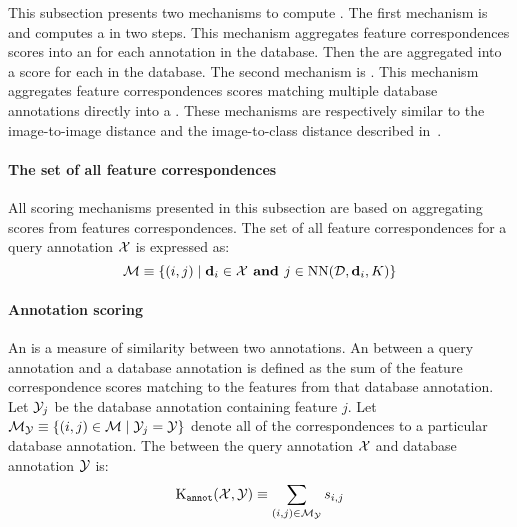         This subsection presents two mechanisms to compute \namescores{}. The first mechanism is \csumprefix{} and
        computes a \namescore{} in two steps. This mechanism aggregates feature correspondences scores into an
        \annotscore{} for each annotation in the database. Then the \annotscores{} are aggregated into a score for
        each \name{} in the database. The second mechanism is \nsumprefix{}. This mechanism aggregates feature
        correspondences scores matching multiple database annotations directly into a \namescore{}. These
        mechanisms are respectively similar to the image-to-image distance and the image-to-class distance
        described in~\cite{boiman_defense_2008}.

        \paragraph{The set of all feature correspondences}
        All scoring mechanisms presented in this subsection are based on aggregating scores from features
        correspondences. The set of all feature correspondences for a query annotation $\mathcal{X}$ is expressed as:
        \begin{equation}
            \mathcal{M} \equiv \{(i, j) \mid \mathbf{d}_i \in \mathcal{X} \textbf{ and } j \in \operatorname{NN}(\mathcal{D}, \mathbf{d}_i, K)\}
        \end{equation}

        \paragraph{Annotation scoring}
            An \annotscore{} is a measure of similarity between two annotations.
            An \annotscore{} between a query annotation and a database annotation is defined as the sum of the
              feature correspondence scores matching to the features from that database annotation.
            Let $\mathcal{Y}_j$ be the database annotation containing feature $j$.
            Let
            $\mathcal{M}_{\mathcal{Y}} \equiv \left\{(i, j) \in \mathcal{M} \mid \mathcal{Y}_j = \mathcal{Y}\right\}$
            denote all of the correspondences to a particular database annotation.
            The \annotscore{} between the query annotation $\mathcal{X}$ and database annotation $\mathcal{Y}$ is:
            \begin{equation}
                \operatorname{K_{\tt annot}}(\mathcal{X}, \mathcal{Y}) \equiv \sum_{(i, j) \in \mathcal{M}_{\mathcal{Y}}} s_{i, j}
            \end{equation}

